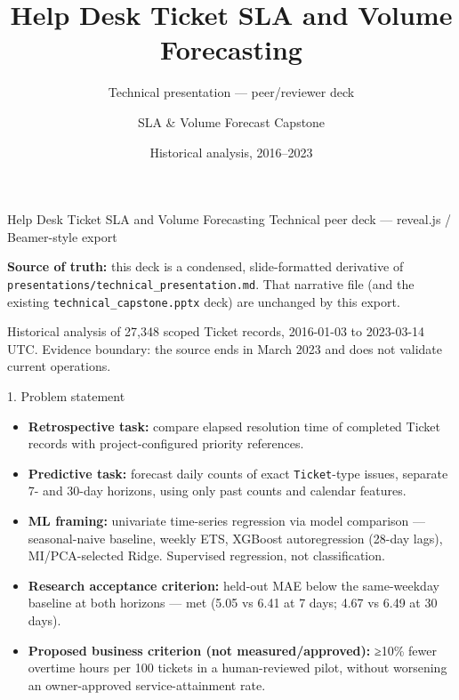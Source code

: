 \documentclass[
  ignorenonframetext,
]{beamer}
\title{\texorpdfstring{Help Desk Ticket SLA and Volume
Forecasting}{Help Desk Ticket SLA and Volume Forecasting}}
\subtitle{\texorpdfstring{Technical presentation --- peer/reviewer
deck}{Technical presentation --- peer/reviewer deck}}
\author{\texorpdfstring{SLA \& Volume Forecast
Capstone}{SLA \& Volume Forecast Capstone}}
\date{Historical analysis, 2016--2023}
\providecommand{\tightlist}{%
  \setlength{\itemsep}{0pt}\setlength{\parskip}{0pt}}
\begin{document}
\frame{\titlepage}

\begin{frame}[fragile]{Help Desk Ticket SLA and Volume Forecasting}
\protect{}\label{help-desk-ticket-sla-and-volume-forecasting}
Technical peer deck --- reveal.js / Beamer-style export

\textbf{Source of truth:} this deck is a condensed, slide-formatted
derivative of \texttt{presentations/technical\_presentation.md}. That
narrative file (and the existing \texttt{technical\_capstone.pptx} deck)
are unchanged by this export.

Historical analysis of 27,348 scoped Ticket records, 2016-01-03 to
2023-03-14 UTC. Evidence boundary: the source ends in March 2023 and
does not validate current operations.
\end{frame}

\begin{frame}[fragile]
\begin{block}{1. Problem statement}
\protect{}\label{1-problem-statement}
\begin{itemize}
\tightlist
\item
  \textbf{Retrospective task:} compare elapsed resolution time of
  completed Ticket records with project-configured priority references.
\item
  \textbf{Predictive task:} forecast daily counts of exact
  \texttt{Ticket}-type issues, separate 7- and 30-day horizons, using
  only past counts and calendar features.
\item
  \textbf{ML framing:} univariate time-series regression via model
  comparison --- seasonal-naive baseline, weekly ETS, XGBoost
  autoregression (28-day lags), MI/PCA-selected Ridge. Supervised
  regression, not classification.
\item
  \textbf{Research acceptance criterion:} held-out MAE below the
  same-weekday baseline at both horizons --- met (5.05 vs 6.41 at 7
  days; 4.67 vs 6.49 at 30 days).
\item
  \textbf{Proposed business criterion (not measured/approved):} ≥10\%
  fewer overtime hours per 100 tickets in a human-reviewed pilot,
  without worsening an owner-approved service-attainment rate.
\end{itemize}
\end{block}
\end{frame}
\end{document}

